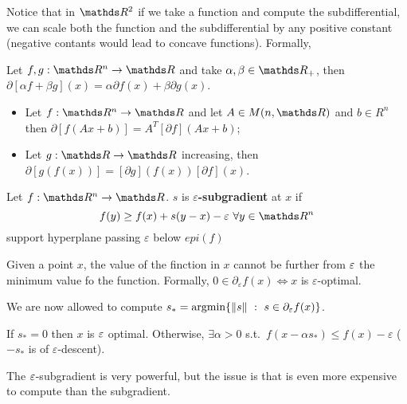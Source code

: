 \documentclass[ComputationalMathematics.tex]{subfiles}
\begin{document}
Notice that in $\R^2$ if we take a function and compute the subdifferential, we can scale both the function and the subdifferential by any positive constant (negative contants would lead to concave functions). Formally,

\begin{proposition}
Let $f,g: \R^n \to \R$ and take $\alpha, \beta \in \R_+$, then $\partial [\alpha f + \beta g](x) = \alpha \partial f(x) + \beta \partial g(x)$.
\end{proposition}

\begin{proposition}
  \begin{itemize}
    \item Let $f: \R^n \to \R$ and let $A \in M(n, \R)$ and $b \in R^n$ then $\partial [f(Ax + b)] = A^T [\partial f](Ax + b) $;
    \item Let $g:\R \to \R$ increasing, then $\partial [g(f(x))] = [\partial g](f(x)) [\partial f](x)$.
  \end{itemize}
\end{proposition}

\begin{definition}
  Let $f: \R^n \to \R$. $s$ is $\varepsilon$\textbf{-subgradient} at $x$ if 
\[
  f(y) \geq f(x) + s (y - x) - \varepsilon~ \forall y \in \R^n
\]
support hyperplane passing $\varepsilon$ below $epi(f)$
\end{definition}

\begin{proposition}
Given a point $x$, the value of the finction in $x$ cannot be further from $\varepsilon$ the minimum value fo the function.
  Formally, $0 \in \partial_\varepsilon f(x) \iff x$ is $\varepsilon$-optimal. 
\end{proposition}

We are now allowed to compute $s_* = \mbox{argmin} \{\left\lVert s\right\rVert~:~ s \in \partial_\varepsilon f(x)\}$.

If $s_* = 0$ then $x$ is $\varepsilon$ optimal. Otherwise, $\exists \alpha > 0$ s.t.~$f(x - \alpha s_*) \leq f(x) - \varepsilon$ ($- s_*$ is of $\varepsilon$-descent).

The $\varepsilon$-subgradient is very powerful, but the issue is that is even more expensive to compute than the subgradient.
\end{document}
